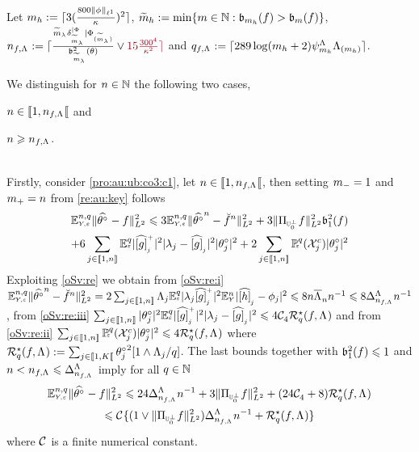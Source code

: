 \begin{pro}
Let
  $\Di_{\ydf}:=\ceil{3(\tfrac{800\Vnormlp[1]{\fydf}}{\cpen})^2}$,
  $\tDi_{\ydf}:=\min\{\Di\in\Nz:\bias[\Di_{\ydf}](\xdf)>\bias[\Di](\xdf)\}$,
  $\ssY_{\xdf,\iSv}:=\ceil{\tfrac{\tDi_{\Sv}\cmSvs[\tDi_{\Sv}]\mSvs[\tDi_{\Sv}]}{\bias[\tDi_{\Sv}]^2(\So)}\vee \dr15\tfrac{300^4}{\cpen^2}}$
  and $\ssE_{\xdf,\iSv}:=\ceil{289\log(\Di_{\ydf}+2)\cmiSv[\Di_{\ydf}]\miSv[\Di_{\ydf}]}$.

We distinguish for $\ssY\in\Nz$ the following two
cases, \begin{inparaenum}[i]\renewcommand{\theenumi}{\dgrau\rm(\alph{enumi})}\item\label{pro:au:ub:co3:c1}
$\ssY\in\nsetro{1,\ssY_{\xdf,\iSv}}$ and \item\label{pro:au:ub:co3:c2}
$\ssY\geq\ssY_{\xdf,\iSv}$.\end{inparaenum}\\


Firstly, consider \ref{pro:au:ub:co3:c1},  let
$\ssY\in\nsetro{1,\ssY_{\xdf,\iSv}}$, then setting $\mDi=1$ and
$\pDi=\ssY$ from \cref{re:au:key} follows
\begin{multline*}
\FuEx[\ssY,\ssE]{\rY,\rE}\VnormLp{\hxdfPr[]-\xdf}^2\leq 
3\FuEx[\ssY,\ssE]{\rY,\rE}\VnormLp{\hxdfPr[\ssY]-\dxdfPr[\ssY]}^2
+3 \VnormLp{\Proj[{\mHiH[0]^\perp}]\xdf}^2\bias[1]^2(\xdf)\\
+6\sum_{j\in\nset{1,\ssY}}\FuEx[\ssE]{\rE}|\hfedfmpI[j]|^2|\fedf[j]-\hfedf[j]|^2|\fxdf[j]|^2
+2\sum_{j\in\nset{1,\ssY}}\FuVg[\ssE]{\rE}(\xEv^c)|\fxdf[j]|^2
\end{multline*}
Exploiting \cref{oSv:re} we obtain from 
\ref{oSv:re:i}
$\FuEx[\ssY,\ssE]{\rY,\rE}\VnormLp{\hxdfPr[\ssY]-\dxdfPr[\ssY]}^2=
2\sum_{j\in\nset{1,n}}\iSv[j]\FuEx[\ssE]{\rE}|\fedf[j]\hfedfmpI[j]|^2\FuEx[\ssY]{\rY}|\hfydf[j]-\fydf[j]|^2\leq8\ssY\oiSv[\ssY]\ssY^{-1}\leq 8\DipenSv[\ssY_{\xdf,\iSv}]\ssY^{-1}$, 
from \ref{oSv:re:iii}
$\sum_{j\in\nset{1,\ssY}}|\fxdf[j]|^2\FuEx[\ssE]{\rE}|\hfedfmpI[j]|^2|\fedf[j]-\hfedf[j]|^2\leq4\cst{4}\mRa{\xdf,\iSv}$
and from
\ref{oSv:re:ii}
$\sum_{j\in\nset{1,n}}\FuVg[\ssE]{\rE}(\xEv^c)|\fxdf[j]|^2
\leq4\mRa{\xdf,\iSv}$ where  $\mRa{\xdf,\iSv}:=\sum_{j\in\nsetro{1,K}}\fxdf[j]^2[1\wedge
\iSv[j]/\ssE]$. The
last bounds together with $\bias[1]^2(\xdf)\leq1$ and $\ssY<\ssY_{\xdf,\iSv}\leq\DipenSv[\ssY_{\xdf,\iSv}]$ imply for all $\ssE\in\Nz$
\begin{multline}\label{pro:au:ub:co3:e1}
\FuEx[\ssY,\ssE]{\rY,\rE}\VnormLp{\hxdfPr[]-\xdf}^2\leq 
24\DipenSv[\ssY_{\xdf,\iSv}]\ssY^{-1}+3 \VnormLp{\Proj[{\mHiH[0]^\perp}]\xdf}^2
+(24\cst{4}+8)\mRa{\xdf,\iSv}\\\leq \cst{}\{(1\vee\VnormLp{\Proj[{\mHiH[0]^\perp}]\xdf}^2)\DipenSv[\ssY_{\xdf,\iSv}]\ssY^{-1}+\mRa{\xdf,\iSv}\}
\end{multline}
where $\cst{}$ is a finite numerical constant.


\end{pro}
